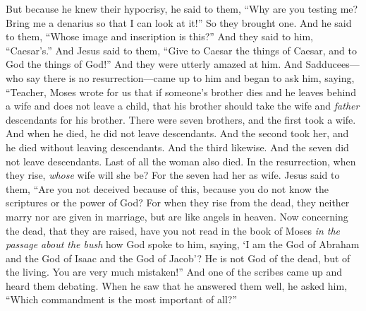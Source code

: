 \begin{biblechapter}
\verse But because he knew their hypocrisy, he said to them, “Why are you testing me? Bring me a denarius so that I can look at it!”
\verse So they brought one. And he said to them, “Whose image and inscription is this?” And they said to him, “Caesar’s.”
\verse And Jesus said to them, “Give to Caesar the things of Caesar, and to God the things of God!” And they were utterly amazed at him.
 And Sadducees—who say there is no resurrection—came up to him and began to ask him, saying,
\verse “Teacher, Moses wrote for us that if someone’s brother dies and he leaves behind a wife and does not leave a child, that his brother should take the wife and \textit{father} descendants for his brother.
\verse There were seven brothers, and the first took a wife. And when he died, he did not leave descendants.
\verse And the second took her, and he died without leaving descendants. And the third likewise.
\verse And the seven did not leave descendants. Last of all the woman also died.
\verse In the resurrection, when they rise, \textit{whose} wife will she be? For the seven had her as wife.
\verse Jesus said to them, “Are you not deceived because of this, because you do not know the scriptures or the power of God?
\verse For when they rise from the dead, they neither marry nor are given in marriage, but are like angels in heaven.
\verse Now concerning the dead, that they are raised, have you not read in the book of Moses \textit{in the passage about the bush} how God spoke to him, saying, ‘I am the God of Abraham and the God of Isaac and the God of Jacob’?
\verse He is not God of the dead, but of the living. You are very much mistaken!”
 And one of the scribes came up and heard them debating. When he saw that he answered them well, he asked him, “Which commandment is the most important of all?”

\end{biblechapter}
